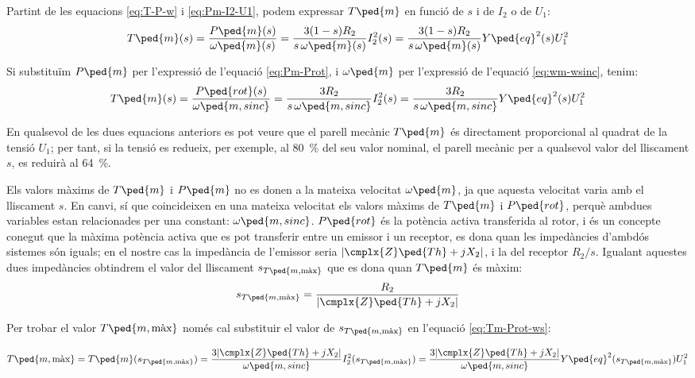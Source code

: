 Partint de les equacions \eqref{eq:T-P-w} i \eqref{eq:Pm-I2-U1}, podem expressar  $T\ped{m}$ en funció de $s$ i de $I_2$ o de $U_1$:
\begin{equation}
    T\ped{m}(s)  =  \frac{P\ped{m}(s)}{\omega\ped{m}(s)} =  \frac{3(1-s) R_2}{s\,\omega\ped{m}(s)} I_2^2(s) =
     \frac{3(1-s) R_2}{s\,\omega\ped{m}(s)} Y\ped{eq}^2(s) U_1^2
\end{equation}

Si substituïm $P\ped{m}$ per l'expressió de l'equació \eqref{eq:Pm-Prot}, i $\omega\ped{m}$ per l'expressió de l'equació \eqref{eq:wm-wsinc}, tenim:
\begin{equation}\index{motors d'inducció!parell mecànic}
    T\ped{m}(s)  =  \frac{P\ped{rot}(s)}{\omega\ped{m,sinc}} =   \frac{3 R_2}{s\,\omega\ped{m,sinc}} I_2^2(s) =
     \frac{3 R_2}{s\,\omega\ped{m,sinc}} Y\ped{eq}^2(s) U_1^2 \label{eq:Tm-Prot-ws}
\end{equation}

En qualsevol de les dues equacions anteriors es pot veure que el parell mecànic $T\ped{m}$ és directament proporcional al quadrat de la tensió $U_1$; per tant, si la tensió es redueix, per exemple, al \qty{80}{\%} del seu valor nominal, el parell mecànic per a qualsevol valor del lliscament $s$,  es reduirà al \qty{64}{\%}.

Els valors màxims de $T\ped{m}$ i $P\ped{m}$ no es donen a la mateixa velocitat  $\omega\ped{m}$, ja que aquesta velocitat varia amb el lliscament $s$. En canvi, sí que coincideixen en una mateixa velocitat els valors  màxims de $T\ped{m}$ i $P\ped{rot}$, perquè ambdues variables estan relacionades per una constant: $\omega\ped{m,sinc}$. $P\ped{rot}$ és la potència activa transferida al rotor, i és un concepte conegut que la màxima potència activa  que es pot transferir entre un emissor i un receptor, es dona quan les impedàncies d'ambdós sistemes són iguals; en el nostre cas la impedància de l'emissor seria $|\cmplx{Z}\ped{Th} + j X_2|$, i la del receptor $R_2/s$. Igualant aquestes dues impedàncies obtindrem el valor del lliscament $s_{T\ped{m,\text{màx}}}$ que es dona quan $T\ped{m}$ és màxim:
\begin{equation}
    s_{T\ped{m,\text{màx}}} =  \frac{R_2}{|\cmplx{Z}\ped{Th} + j X_2|} \label{eq:s-T-max}
\end{equation}

Per trobar el valor  $T\ped{m,\text{màx}}$ només cal substituir el valor de $s_{T\ped{m,\text{màx}}}$ en l'equació \eqref{eq:Tm-Prot-ws}:

\begin{equation}
    T\ped{m,\text{màx}}  =  T\ped{m}(s_{T\ped{m,\text{màx}}}) =  \frac{3 |\cmplx{Z}\ped{Th} + j X_2|}{\omega\ped{m,sinc}} I_2^2(s_{T\ped{m,\text{màx}}}) = \frac{3 |\cmplx{Z}\ped{Th} + j X_2|}{\omega\ped{m,sinc}} Y\ped{eq}^2(s_{T\ped{m,\text{màx}}}) U_1^2
\end{equation}



